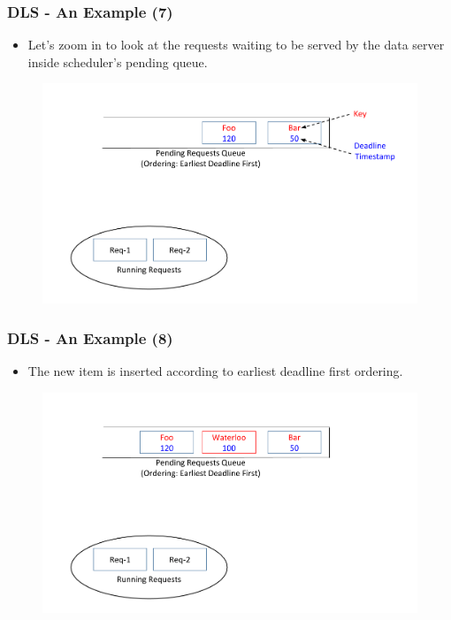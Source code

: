 \documentclass{beamer}
\begin{document}
\begin{frame}
  \frametitle{DLS - An Example (7)}
  \begin{itemize}
  \item Let's zoom in to look at the requests waiting to be served by the data
    server inside scheduler's pending queue.
    \newline
  \end{itemize}
  \vspace{-5 mm}
  \begin{figure}
    \begin{center}
      \centerline{\includegraphics[scale=0.33]{img/DLS_Example_ZOOM_1.png}}
    \end{center}
  \end{figure}
\end{frame}

\begin{frame}
  \frametitle{DLS - An Example (8)}
  \begin{itemize}
  \item The new item is inserted according to earliest deadline first ordering.
    \newline
  \end{itemize}
  \vspace{-5 mm}
  \begin{figure}
    \begin{center}
      \centerline{\includegraphics[scale=0.33]{img/DLS_Example_ZOOM_2.png}}
    \end{center}
  \end{figure}
\end{frame}
\end{document}
